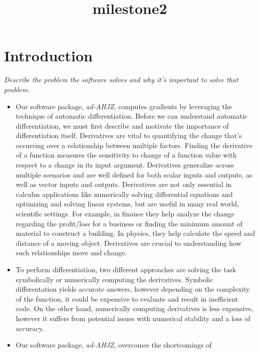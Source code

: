 \documentclass[11pt]{article}
\title{milestone2}
\begin{document}
    
    \maketitle
    
    

    
    \hypertarget{introduction}{%
\section{Introduction}\label{introduction}}

    \emph{Describe the problem the software solves and why it's important to
solve that problem.}

\begin{itemize}
\item
  Our software package, \emph{ad-AHJZ}, computes gradients by leveraging
  the technique of automatic differentiation. Before we can understand
  automatic differentiation, we must first describe and motivate the
  importance of differentiation itself. Derivatives are vital to
  quantifying the change that's occurring over a relationship between
  multiple factors. Finding the derivative of a function measures the
  sensitivity to change of a function value with respect to a change in
  its input argument. Derivatives generalize across multiple scenarios
  and are well defined for both scalar inputs and outputs, as well as
  vector inputs and outputs. Derivatives are not only essential in
  calculus applications like numerically solving differential equations
  and optimizing and solving linear systems, but are useful in many real
  world, scientific settings. For example, in finance they help analyze
  the change regarding the profit/loss for a business or finding the
  minimum amount of material to construct a building. In physics, they
  help calculate the speed and distance of a moving object. Derivatives
  are crucial to understanding how such relationships move and change.
\item
  To perform differentiation, two different approaches are solving the
  task symbolically or numerically computing the derivatives. Symbolic
  differentation yields accurate answers, however depending on the
  complexity of the function, it could be expensive to evaluate and
  result in inefficient code. On the other hand, numerically computing
  derivatives is less expensive, however it suffers from potential
  issues with numerical stability and a loss of accuracy.
\item
  Our software package, \emph{ad-AHJZ}, overcomes the shortcomings of

\end{itemize}
\end{document}
